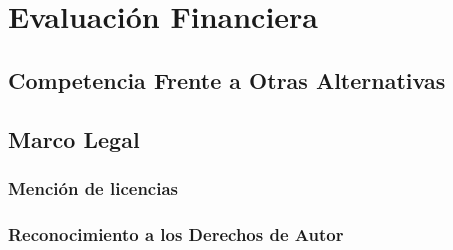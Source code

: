 \chapter{Evaluación Financiera}

\section{Competencia Frente a Otras Alternativas}

\section{Marco Legal}

\subsection{Mención de licencias}

\subsection{Reconocimiento a los Derechos de Autor}




